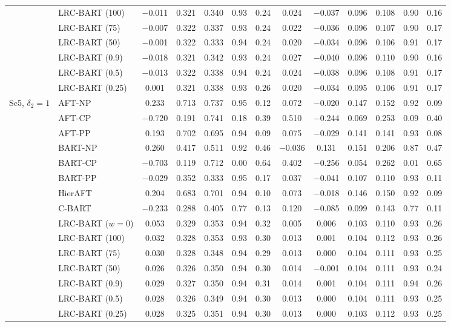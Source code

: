 \begin{center}
\begin{longtable}{llccccccccccc}
& LRC-BART (100) & $-$0.011 & 0.321 & 0.340 & 0.93 & 0.24 & 0.024 & $-$0.037 & 0.096 & 0.108 & 0.90 & 0.16 \\
& LRC-BART (75) & $-$0.007 & 0.322 & 0.337 & 0.93 & 0.24 & 0.022 & $-$0.036 & 0.096 & 0.107 & 0.90 & 0.17 \\
& LRC-BART (50) & $-$0.001 & 0.322 & 0.333 & 0.94 & 0.24 & 0.020 & $-$0.034 & 0.096 & 0.106 & 0.91 & 0.17 \\
& LRC-BART (0.9) & $-$0.018 & 0.321 & 0.342 & 0.93 & 0.24 & 0.027 & $-$0.040 & 0.096 & 0.110 & 0.90 & 0.16 \\
& LRC-BART (0.5) & $-$0.013 & 0.322 & 0.338 & 0.94 & 0.24 & 0.024 & $-$0.038 & 0.096 & 0.108 & 0.91 & 0.17 \\
& LRC-BART (0.25) & 0.001 & 0.321 & 0.338 & 0.93 & 0.26 & 0.020 & $-$0.034 & 0.095 & 0.106 & 0.91 & 0.17 \\
\midrule
\multirow{15}{*}{Sc5, $\delta_2=1$} & AFT-NP & 0.233 & 0.713 & 0.737 & 0.95 & 0.12 & 0.072 & $-$0.020 & 0.147 & 0.152 & 0.92 & 0.09 \\
& AFT-CP & $-$0.720 & 0.191 & 0.741 & 0.18 & 0.39 & 0.510 & $-$0.244 & 0.069 & 0.253 & 0.09 & 0.40 \\
& AFT-PP & 0.193 & 0.702 & 0.695 & 0.94 & 0.09 & 0.075 & $-$0.029 & 0.141 & 0.141 & 0.93 & 0.08 \\
& BART-NP & 0.260 & 0.417 & 0.511 & 0.92 & 0.46 & $-$0.036 & 0.131 & 0.151 & 0.206 & 0.87 & 0.47 \\
& BART-CP & $-$0.703 & 0.119 & 0.712 & 0.00 & 0.64 & 0.402 & $-$0.256 & 0.054 & 0.262 & 0.01 & 0.65 \\
& BART-PP & $-$0.029 & 0.352 & 0.333 & 0.95 & 0.17 & 0.037 & $-$0.041 & 0.107 & 0.110 & 0.93 & 0.11 \\
& HierAFT & 0.204 & 0.683 & 0.701 & 0.94 & 0.10 & 0.073 & $-$0.018 & 0.146 & 0.150 & 0.92 & 0.09 \\
& C-BART & $-$0.233 & 0.288 & 0.405 & 0.77 & 0.13 & 0.120 & $-$0.085 & 0.099 & 0.143 & 0.77 & 0.11 \\
& LRC-BART ($w=0$) & 0.053 & 0.329 & 0.353 & 0.94 & 0.32 & 0.005 & 0.006 & 0.103 & 0.110 & 0.93 & 0.26 \\
& LRC-BART (100) & 0.032 & 0.328 & 0.353 & 0.93 & 0.30 & 0.013 & 0.001 & 0.104 & 0.112 & 0.93 & 0.26 \\
& LRC-BART (75) & 0.030 & 0.328 & 0.348 & 0.94 & 0.29 & 0.013 & 0.000 & 0.104 & 0.111 & 0.93 & 0.25 \\
& LRC-BART (50) & 0.026 & 0.326 & 0.350 & 0.94 & 0.30 & 0.014 & $-$0.001 & 0.104 & 0.111 & 0.93 & 0.24 \\
& LRC-BART (0.9) & 0.029 & 0.327 & 0.350 & 0.94 & 0.31 & 0.014 & 0.001 & 0.104 & 0.111 & 0.94 & 0.26 \\
& LRC-BART (0.5) & 0.028 & 0.326 & 0.349 & 0.94 & 0.30 & 0.013 & 0.000 & 0.104 & 0.111 & 0.93 & 0.25 \\
& LRC-BART (0.25) & 0.028 & 0.325 & 0.351 & 0.94 & 0.30 & 0.013 & 0.000 & 0.103 & 0.112 & 0.93 & 0.25 \\
\end{longtable}
\end{center}
